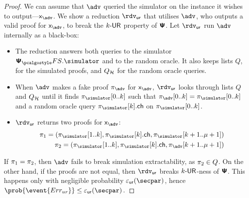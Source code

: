 \begin{proof}
{		We can assume that $\advse$ queried the simulator on the instance it wishes to
		output---$\inp_{\advse}$. We show a reduction $\rdvur$ that utilises $\advse$,
		who outputs a valid proof for $\inp_{\advse}$, to break the ${k\text{-}\mathsf{UR}}$ property of
		$\bm{\mathsf{\Psi}}$. Let $\rdvur$ run $\advse$ internally as a black-box:
		\begin{itemize}
			\item The reduction answers both queries to the simulator $\psfs.\simulator$ and to the random oracle. 
			It also keeps lists $Q$, for the simulated proofs, and $Q_{\mathcal{H}}$ for the random oracle queries. 
			\item When $\advse$ makes a fake proof $\zkproof_{\advse}$ for $\inp_{\advse}$,
			$\rdvur$ looks through lists $Q$ and $Q_{\mathcal{H}}$ until it finds
			$\zkproof_{\simulator}[0..k]$ such that
			$\zkproof_{\advse}[0..k] = \zkproof_{\simulator}[0..k]$
			and a random oracle query $\zkproof_{\simulator}[k].\ch$ on
			$\zkproof_{\simulator}[0..k]$.
			\item $\rdvur$ returns two proofs for $\inp_{\advse}$:
			\begin{align*}
			\zkproof_1 = (\zkproof_{\simulator}[1..k],
			\zkproof_{\simulator}[k].\ch, \zkproof_{\simulator}[k + 1..\mu + 1])\\
			\zkproof_2 = (\zkproof_{\simulator}[1..k],
			\zkproof_{\simulator}[k].\ch, \zkproof_{\advse}[k + 1..\mu + 1])
			\end{align*}
		\end{itemize}  
		If $\pi_1 = \pi_2$, then $\advse$ fails to break simulation
		extractability, as $\pi_2 \in Q$. On the other hand, if the proofs are
		not equal, then $\rdvur$ breaks ${k\text{-}\mathsf{UR}}$-ness of $\bm{\mathsf{\Psi}}$. This happens only with
		negligible probability $\epsur(\secpar)$, hence \( \prob{\event{\errur}} \leq
		\epsur(\secpar)\,. \)
	}
\end{proof}
